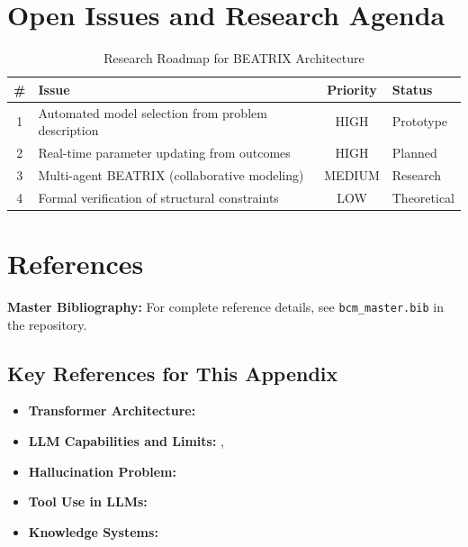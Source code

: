 \section{Open Issues and Research Agenda}
\label{sec:bx-open}

\begin{table}[htbp]
\centering
\caption{Research Roadmap for BEATRIX Architecture}
\label{tab:bx-roadmap}
\renewcommand{\arraystretch}{1.3}
\begin{tabular}{@{}clcl@{}}
\toprule
\textbf{\#} & \textbf{Issue} & \textbf{Priority} & \textbf{Status} \\
\midrule
1 & Automated model selection from problem description & HIGH & Prototype \\
2 & Real-time parameter updating from outcomes & HIGH & Planned \\
3 & Multi-agent BEATRIX (collaborative modeling) & MEDIUM & Research \\
4 & Formal verification of structural constraints & LOW & Theoretical \\
\bottomrule
\end{tabular}
\end{table}


\section{References}
\label{sec:bx-references}

\begin{tcolorbox}[colback=blue!5!white, colframe=blue!75!black]
\textbf{Master Bibliography:} For complete reference details, see
\texttt{bcm\_master.bib} in the repository.
\end{tcolorbox}

\subsection{Key References for This Appendix}

\begin{itemize}[nosep]
    \item \textbf{Transformer Architecture:} \citet{vaswani2017attention}
    \item \textbf{LLM Capabilities and Limits:} \citet{brown2020language}, \citet{wei2022emergent}
    \item \textbf{Hallucination Problem:} \citet{ji2023survey}
    \item \textbf{Tool Use in LLMs:} \citet{schick2023toolformer}
    \item \textbf{Knowledge Systems:} \citet{nonaka1995knowledge}
\end{itemize}

